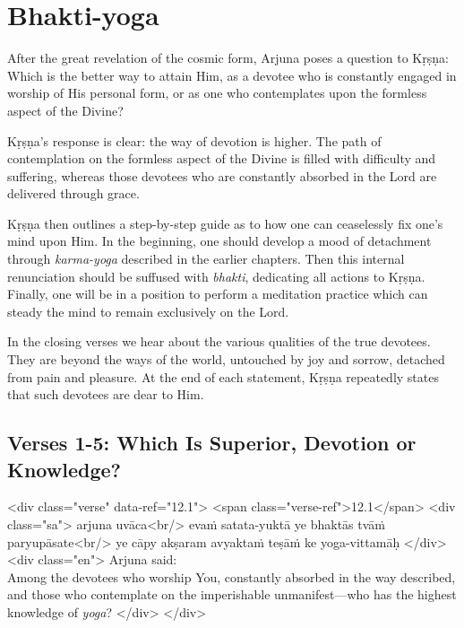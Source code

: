 \chapter{Bhakti-yoga}\label{chap-bhakti-yoga}

\noindent After the great revelation of the cosmic form, Arjuna poses a question to Kṛṣṇa: Which is the better way to attain Him, as a devotee who is constantly engaged in worship of His personal form, or as one who contemplates upon the formless aspect of the Divine?

Kṛṣṇa's response is clear: the way of devotion is higher. The path of contemplation on the formless aspect of the Divine is filled with difficulty and suffering, whereas those devotees who are constantly absorbed in the Lord are delivered through grace.

Kṛṣṇa then outlines a step-by-step guide as to how one can ceaselessly fix one’s mind upon Him. In the beginning, one should develop a mood of detachment through \textit{karma-yoga} described in the earlier chapters. Then this internal renunciation should be suffused with \textit{bhakti}, dedicating all actions to Kṛṣṇa. Finally, one will be in a position to perform a meditation practice which can steady the mind to remain exclusively on the Lord.

In the closing verses we hear about the various qualities of the true devotees. They are beyond the ways of the world, untouched by joy and sorrow, detached from pain and pleasure. At the end of each statement, Kṛṣṇa repeatedly states that such devotees are dear to Him.

\section{Verses 1-5: Which Is Superior, Devotion or Knowledge?}\label{sec-verses-1-5-which-is-superior-devotion-or-knowledge}


\begin{html}
<div class="verse" data-ref="12.1">
  <span class="verse-ref">12.1</span>
  <div class="sa">
    arjuna uvāca<br/>
    evaṁ satata-yuktā ye bhaktās tvāṁ paryupāsate<br/>
    ye cāpy akṣaram avyaktaṁ teṣāṁ ke yoga-vittamāḥ
  </div>
  <div class="en">
    \hspace*{1em}Arjuna said: \\ Among the devotees who worship You, constantly absorbed in the way described, and those who contemplate on the imperishable unmanifest---who has the highest knowledge of \textit{yoga}?
  </div>
</div>
\end{html}



